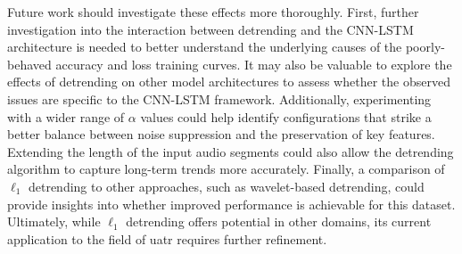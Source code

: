 Future work should investigate these effects more thoroughly. First, further investigation into the interaction between detrending and the CNN-LSTM architecture is needed to better understand the underlying causes of the poorly-behaved accuracy and loss training curves. It may also be valuable to explore the effects of detrending on other model architectures to assess whether the observed issues are specific to the CNN-LSTM framework. Additionally, experimenting with a wider range of $\alpha$ values could help identify configurations that strike a better balance between noise suppression and the preservation of key features. Extending the length of the input audio segments could also allow the detrending algorithm to capture long-term trends more accurately. Finally, a comparison of $\ell_1$ detrending to other approaches, such as wavelet-based detrending, could provide insights into whether improved performance is achievable for this dataset. Ultimately, while $\ell_1$ detrending offers potential in other domains, its current application to the field of \acrlong{uatr} requires further refinement.